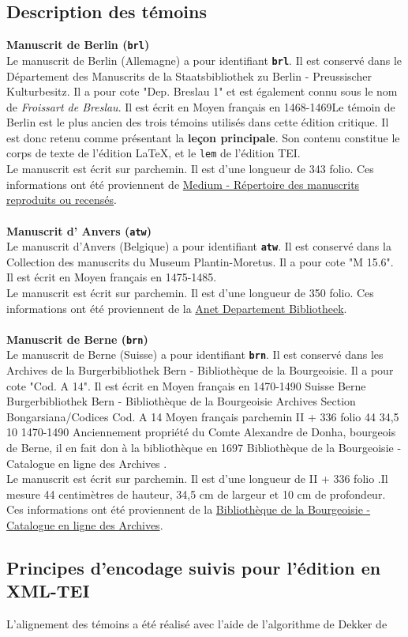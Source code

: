 \documentclass[12pt, a4paper]{article}
\begin{document}
\subsection{Description des témoins} \noindent \textbf{Manuscrit de Berlin (\texttt{brl})}\\ \indent Le manuscrit de Berlin (Allemagne) a pour identifiant \textbf{\texttt{brl}}. Il est conservé dans le Département des Manuscrits de la Staatsbibliothek zu Berlin - Preussischer Kulturbesitz. Il a pour cote "Dep. Breslau 1" et est également connu sous le nom de \textit{Froissart de Breslau}. Il est écrit en Moyen français en 1468-1469Le témoin de Berlin est le plus ancien des trois témoins utilisés dans cette édition critique. Il est donc retenu comme présentant la \textbf{leçon principale}. Son contenu constitue le corps de texte de l'édition \LaTeX, et le \texttt{lem} de l'édition TEI.\\ \indent Le manuscrit est écrit sur parchemin. Il est d'une longueur de 343 folio. Ces informations ont été proviennent de \href{http://medium-avance.irht.cnrs.fr/ark:/63955/md44pk02gf53}{Medium - Répertoire des manuscrits reproduits ou recensés}.\\~\\\noindent \textbf{Manuscrit d' Anvers (\texttt{atw})}\\ \indent Le manuscrit d'Anvers (Belgique) a pour identifiant \textbf{\texttt{atw}}. Il est conservé dans la Collection des manuscrits du Museum Plantin-Moretus. Il a pour cote "M 15.6". Il est écrit en Moyen français en 1475-1485.\\ \indent Le manuscrit est écrit sur parchemin. Il est d'une longueur de 350 folio. Ces informations ont été proviennent de la \href{https://anet.be/record/opacmpm/c:lvd:14057240/F}{Anet Departement Bibliotheek}.\\~\\\noindent \textbf{Manuscrit de Berne (\texttt{brn})}\\ \indent Le manuscrit de Berne (Suisse) a pour identifiant \textbf{\texttt{brn}}. Il est conservé dans les Archives de la Burgerbibliothek Bern - Bibliothèque de la Bourgeoisie. Il a pour cote "Cod. A 14". Il est écrit en Moyen français en 1470-1490 Suisse Berne Burgerbibliothek Bern - Bibliothèque de la Bourgeoisie Archives Section Bongarsiana/Codices Cod. A 14 Moyen français parchemin II + 336 folio 44 34,5 10 1470-1490 Anciennement propriété du Comte Alexandre de Donha, bourgeois de Berne, il en fait don à la bibliothèque en 1697 Bibliothèque de la Bourgeoisie - Catalogue en ligne des Archives .\\ \indent Le manuscrit est écrit sur parchemin. Il est d'une longueur de II + 336 folio .Il mesure 44 centimètres de hauteur, 34,5 cm de largeur et 10 cm de profondeur. Ces informations ont été proviennent de la \href{http://katalog.burgerbib.ch/detail.aspx?ID=147296}{Bibliothèque de la Bourgeoisie - Catalogue en ligne des Archives}. \subsection{Principes d'encodage suivis pour l'édition en XML-TEI} L'alignement des témoins a été réalisé avec l'aide de l'algorithme de Dekker de 
\end{document}
